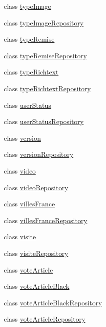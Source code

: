 \begin{DoxyCompactItemize}
class \hyperlink{class_acme_group_1_1_labo_bundle_1_1_entity_1_1type_image}{type\+Image}
\item 
class \hyperlink{class_acme_group_1_1_labo_bundle_1_1_entity_1_1type_image_repository}{type\+Image\+Repository}
\item 
class \hyperlink{class_acme_group_1_1_labo_bundle_1_1_entity_1_1type_remise}{type\+Remise}
\item 
class \hyperlink{class_acme_group_1_1_labo_bundle_1_1_entity_1_1type_remise_repository}{type\+Remise\+Repository}
\item 
class \hyperlink{class_acme_group_1_1_labo_bundle_1_1_entity_1_1type_richtext}{type\+Richtext}
\item 
class \hyperlink{class_acme_group_1_1_labo_bundle_1_1_entity_1_1type_richtext_repository}{type\+Richtext\+Repository}
\item 
class \hyperlink{class_acme_group_1_1_labo_bundle_1_1_entity_1_1user_status}{user\+Status}
\item 
class \hyperlink{class_acme_group_1_1_labo_bundle_1_1_entity_1_1user_status_repository}{user\+Status\+Repository}
\item 
class \hyperlink{class_acme_group_1_1_labo_bundle_1_1_entity_1_1version}{version}
\item 
class \hyperlink{class_acme_group_1_1_labo_bundle_1_1_entity_1_1version_repository}{version\+Repository}
\item 
class \hyperlink{class_acme_group_1_1_labo_bundle_1_1_entity_1_1video}{video}
\item 
class \hyperlink{class_acme_group_1_1_labo_bundle_1_1_entity_1_1video_repository}{video\+Repository}
\item 
class \hyperlink{class_acme_group_1_1_labo_bundle_1_1_entity_1_1villes_france}{villes\+France}
\item 
class \hyperlink{class_acme_group_1_1_labo_bundle_1_1_entity_1_1villes_france_repository}{villes\+France\+Repository}
\item 
class \hyperlink{class_acme_group_1_1_labo_bundle_1_1_entity_1_1visite}{visite}
\item 
class \hyperlink{class_acme_group_1_1_labo_bundle_1_1_entity_1_1visite_repository}{visite\+Repository}
\item 
class \hyperlink{class_acme_group_1_1_labo_bundle_1_1_entity_1_1vote_article}{vote\+Article}
\item 
class \hyperlink{class_acme_group_1_1_labo_bundle_1_1_entity_1_1vote_article_black}{vote\+Article\+Black}
\item 
class \hyperlink{class_acme_group_1_1_labo_bundle_1_1_entity_1_1vote_article_black_repository}{vote\+Article\+Black\+Repository}
\item 
class \hyperlink{class_acme_group_1_1_labo_bundle_1_1_entity_1_1vote_article_repository}{vote\+Article\+Repository}
\end{DoxyCompactItemize}
